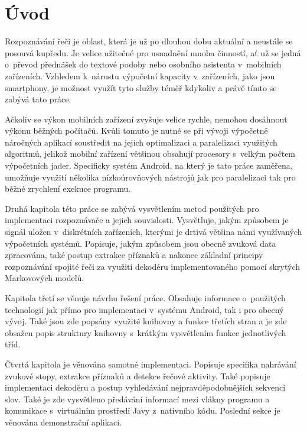 
\chapter{Úvod}
Rozpoznávání řeči je oblast, která je už po dlouhou dobu aktuální a neustále se posouvá kupředu. Je velice užitečné pro usnadnění mnoha činností, ať už se jedná o~převod přednášek do textové podoby nebo osobního asistenta v~mobilních zařízeních. Vzhledem k~nárustu výpočetní kapacity v~zařízeních, jako jsou smartphony, je možnost využít tyto služby téměř kdykoliv a právě tímto se zabývá tato práce. 

Ačkoliv se výkon mobilních zařízení zvyšuje velice rychle, nemohou dosáhnout výkonu běžných počítačů. Kvůli tomuto je nutné se při vývoji výpočetně náročných aplikací soustředit na jejich optimalizaci a paralelizaci využitých algoritmů, jelikož mobilní zařízení většinou obsahují procesory s~velkým počtem výpočetních jader. Specificky systém Android, na který je tato práce zaměřena, umožňuje využití několika nízkoúrovňových nástrojů jak pro paralelizaci tak pro běžné zrychlení exekuce programu.

Druhá kapitola této práce se zabývá vysvětlením metod použitých pro implementaci rozpoznávače a jejich souvislosti. Vysvětluje, jakým způsobem je signál uložen v~diskrétních zařízeních, kterými je drtivá většina námi využívaných výpočetních systémů. Popisuje, jakým způsobem jsou obecně zvuková data zpracována, také postup extrakce příznaků a nakonec základní principy rozpoznávání spojité řeči za využití dekodéru implementovaného pomocí skrytých Markovových modelů.

Kapitola třetí se věnuje návrhu řešení práce. Obsahuje informace o~použitých technologií jak přímo pro implementaci v~systému Android, tak i pro obecný vývoj. Také jsou zde popsány využité knihovny a funkce třetích stran a je zde obsažen popis struktury knihovny s~krátkým vysvětlením funkce jednotlivých tříd.

Čtvrtá kapitola je věnována samotné implementaci. Popisuje specifika nahrávání zvukové stopy, extrakce příznaků a detekce řečové aktivity. Také popisuje implementaci dekodéru a postup vyhledávání nejpravděpodobnějších sekvencí slov. Také je zde vysvětleno předávání informací mezi vlákny programu a komunikace s~virtuálním prostředí Javy z~nativního kódu. Poslední sekce je věnována demonstrační aplikaci.

